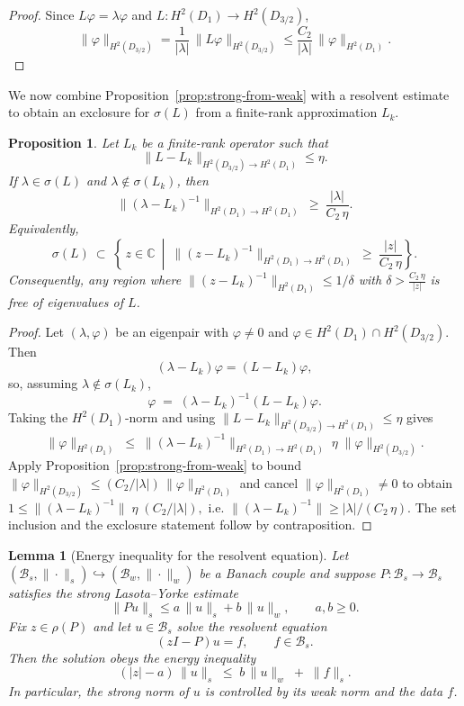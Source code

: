 \documentclass[11pt]{article}
\newtheorem{lemma}[definition]{Lemma}
\newtheorem{proposition}[definition]{Proposition}
\begin{document}
\begin{proof}
Since $L\varphi=\lambda\varphi$ and $L:H^2(D_1)\to H^2(D_{3/2})$,
\[
\|\varphi\|_{H^2(D_{3/2})}
=\frac{1}{|\lambda|}\,\|L\varphi\|_{H^2(D_{3/2})}
\le \frac{C_2}{|\lambda|}\,\|\varphi\|_{H^2(D_1)}.
\]
\end{proof}

We now combine Proposition~\ref{prop:strong-from-weak} with a resolvent
estimate to obtain an exclosure for $\sigma(L)$ from a finite-rank
approximation $L_k$.

\begin{proposition}\label{prop:pseudo-exclosure-correct}
Let $L_k$ be a finite-rank operator such that
\[
\|L-L_k\|_{H^{2}(D_{3/2})\to H^{2}(D_{1})} \le \eta.
\]
If $\lambda\in\sigma(L)$ and $\lambda\notin\sigma(L_k)$, then
\[
\bigl\|(\lambda - L_k)^{-1}\bigr\|_{H^{2}(D_{1})\to H^{2}(D_{1})}
\ \ge\ \frac{|\lambda|}{C_2\,\eta}.
\]
Equivalently,
\[
\sigma(L)\ \subset\
\left\{\, z\in\mathbb C\ \middle|\ 
\bigl\|(z - L_k)^{-1}\bigr\|_{H^{2}(D_{1})\to H^{2}(D_{1})}
\ \ge\ \frac{|z|}{C_2\,\eta}\right\}.
\]
Consequently, any region where
$\|(z-L_k)^{-1}\|_{H^{2}(D_{1})}\le 1/\delta$ with $\delta>\frac{C_2\,\eta}{|z|}$
is free of eigenvalues of $L$.
\end{proposition}

\begin{proof}
Let $(\lambda,\varphi)$ be an eigenpair with $\varphi\neq 0$ and
$\varphi\in H^2(D_1)\cap H^2(D_{3/2})$. Then
\[
(\lambda - L_k)\varphi = (L - L_k)\varphi,
\]
so, assuming $\lambda\notin\sigma(L_k)$,
\[
\varphi \;=\; (\lambda - L_k)^{-1}(L - L_k)\varphi.
\]
Taking the $H^2(D_1)$-norm and using
$\|L-L_k\|_{H^{2}(D_{3/2})\to H^{2}(D_{1})}\le\eta$ gives
\[
\|\varphi\|_{H^2(D_1)}
\;\le\;
\bigl\|(\lambda - L_k)^{-1}\bigr\|_{H^{2}(D_{1})\to H^{2}(D_{1})}\;
\eta\;\|\varphi\|_{H^2(D_{3/2})}.
\]
Apply Proposition~\ref{prop:strong-from-weak} to bound
$\|\varphi\|_{H^2(D_{3/2})}\le (C_2/|\lambda|)\,\|\varphi\|_{H^2(D_1)}$ and cancel
$\|\varphi\|_{H^2(D_1)}\neq 0$ to obtain
\(
1 \le \bigl\|(\lambda - L_k)^{-1}\bigr\|\;\eta\; (C_2/|\lambda|),
\)
i.e.
\(
\bigl\|(\lambda - L_k)^{-1}\bigr\|
\ge |\lambda|/(C_2\,\eta).
\)
The set inclusion and the exclosure statement follow by contraposition.
\end{proof}

\begin{lemma}[Energy inequality for the resolvent equation]
\label{lem:energy-ineq}
Let $(\mathcal B_s,\|\cdot\|_s)\hookrightarrow(\mathcal B_w,\|\cdot\|_w)$ be a Banach couple
and suppose $P:\mathcal B_s\to\mathcal B_s$ satisfies the strong Lasota--Yorke estimate
\[
\|Pu\|_s \le a\,\|u\|_s + b\,\|u\|_w, \qquad a,b\ge0.
\]
Fix $z\in\rho(P)$ and let $u\in\mathcal B_s$ solve the resolvent equation
\[
(zI-P)u = f, \qquad f\in\mathcal B_s.
\]
Then the solution obeys the \emph{energy inequality}
\[
\boxed{\ (|z|-a)\,\|u\|_s \;\le\; b\,\|u\|_w \;+\; \|f\|_s.\ }
\]
In particular, the strong norm of $u$ is controlled by its weak norm and the data $f$.
\end{lemma}
\end{document}
